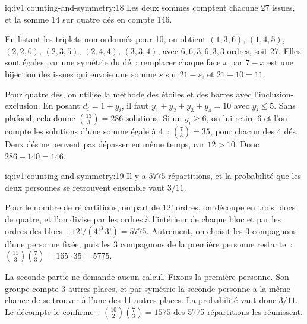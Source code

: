 \begin{solution}{iq:iv1:counting-and-symmetry:18}
Les deux sommes comptent chacune 27 issues, et la somme 14 sur quatre dés en compte 146.

En listant les triplets non ordonnés pour 10, on obtient $(1,3,6)$, $(1,4,5)$, $(2,2,6)$, $(2,3,5)$, $(2,4,4)$, $(3,3,4)$, avec $6, 6, 3, 6, 3, 3$ ordres, soit 27. Elles sont égales par une symétrie du dé~: remplacer chaque face $x$ par $7 - x$ est une bijection des issues qui envoie une somme $s$ sur $21 - s$, et $21 - 10 = 11$.

Pour quatre dés, on utilise la méthode des étoiles et des barres avec l'inclusion-exclusion. En posant $d_i = 1 + y_i$, il faut $y_1 + y_2 + y_3 + y_4 = 10$ avec $y_i \le 5$. Sans plafond, cela donne $\binom{13}{3} = 286$ solutions. Si un $y_i \ge 6$, on lui retire 6 et l'on compte les solutions d'une somme égale à 4~: $\binom{7}{3} = 35$, pour chacun des 4 dés. Deux dés ne peuvent pas dépasser en même temps, car $12 > 10$. Donc $286 - 140 = 146$.

\end{solution}

\begin{solution}{iq:iv1:counting-and-symmetry:19}
Il y a $5775$ répartitions, et la probabilité que les deux personnes se retrouvent ensemble vaut $3/11$.

Pour le nombre de répartitions, on part de $12!$ ordres, on découpe en trois blocs de quatre, et l'on divise par les ordres à l'intérieur de chaque bloc et par les ordres des blocs~: $12!/(4!^3\,3!) = 5775$. Autrement, on choisit les 3 compagnons d'une personne fixée, puis les 3 compagnons de la première personne restante~: $\binom{11}{3}\binom{7}{3} = 165 \cdot 35 = 5775$.

La seconde partie ne demande aucun calcul. Fixons la première personne. Son groupe compte 3 autres places, et par symétrie la seconde personne a la même chance de se trouver à l'une des 11 autres places. La probabilité vaut donc $3/11$. Le décompte le confirme~: $\binom{10}{2}\binom{7}{3} = 1575$ des 5775 répartitions les réunissent.

\end{solution}


